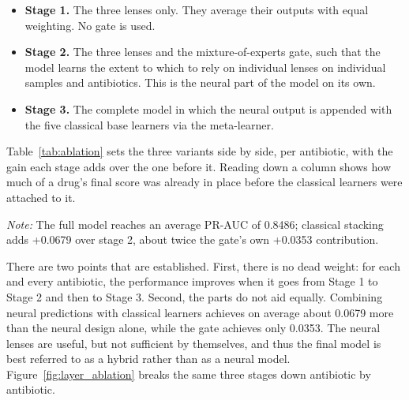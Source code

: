 \begin{itemize}
  \item \textbf{Stage 1.} The three lenses only. They average their outputs
  with equal weighting. No gate is used.
  \item \textbf{Stage 2.} The three lenses and the mixture-of-experts gate,
  such that the model learns the extent to which to rely on individual lenses
  on individual samples and antibiotics. This is the neural part of the model
  on its own.
  \item \textbf{Stage 3.} The complete model in which the neural output is
  appended with the five classical base learners via the meta-learner.
\end{itemize}

Table~\ref{tab:ablation} sets the three variants side by side, per antibiotic, with the gain
each stage adds over the one before it. Reading down a column shows how much of a drug's final
score was already in place before the classical learners were attached to it.

\begin{table}[htb]
\centering
\caption{Component ablation on the random split, with the PR-AUC gain each added
part contributes over the stage before it.}
\label{tab:ablation}
\small
\setlength{\tabcolsep}{3pt}
\vspace{0.4em}

\noindent\footnotesize\textit{Note:} The full model reaches an average PR-AUC of 0.8486;
classical stacking adds +0.0679 over stage 2, about twice the gate's own +0.0353 contribution.
\end{table}
\FloatBarrier

There are two points that are established. First, there is no dead weight: for
each and every antibiotic, the performance improves when it goes from Stage 1
to Stage 2 and then to Stage 3. Second, the parts do not aid equally.
Combining neural predictions with classical learners achieves on average
about 0.0679 more than the neural design alone, while the gate achieves only
0.0353. The neural lenses are useful, but not sufficient by themselves, and
thus the final model is best referred to as a hybrid rather than as a neural
model. Figure~\ref{fig:layer_ablation} breaks the same three stages down antibiotic by
antibiotic.

